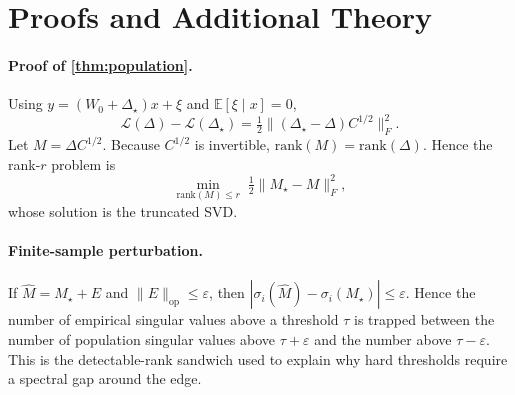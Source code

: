 \documentclass[10pt,twocolumn]{article}
\theoremstyle{definition}
\newcommand{\E}{\mathbb{E}}
\newcommand{\op}{\mathrm{op}}
\newcommand{\rank}{\mathrm{rank}}
\newcommand{\half}{\tfrac12}
\newcommand{\DeltaStar}{\Delta_\star}
\newcommand{\Mstar}{M_\star}
\newcommand{\Mhat}{\widehat M}
\begin{document}
\appendix

\section{Proofs and Additional Theory}
\label{app:proofs}

\paragraph{Proof of \cref{thm:population}.}
Using $y=(W_0+\DeltaStar)x+\xi$ and $\E[\xi\mid x]=0$,
\begin{equation}
    \mathcal L(\Delta)-\mathcal L(\DeltaStar)=\half\| (\DeltaStar-\Delta)C^{1/2}\|_F^2.
\end{equation}
Let $M=\Delta C^{1/2}$.  Because $C^{1/2}$ is invertible, $\rank(M)=\rank(\Delta)$.  Hence the rank-$r$ problem is
\begin{equation}
    \min_{\rank(M)\le r} \; \half\|\Mstar-M\|_F^2,
\end{equation}
whose solution is the truncated SVD.

\paragraph{Finite-sample perturbation.}
If $\Mhat=\Mstar+E$ and $\|E\|_{\op}\le\varepsilon$, then
$|\sigma_i(\Mhat)-\sigma_i(\Mstar)|\le\varepsilon$.  Hence the number
of empirical singular values above a threshold $\tau$ is trapped between the
number of population singular values above $\tau+\varepsilon$ and the number
above $\tau-\varepsilon$.  This is the detectable-rank sandwich used to
explain why hard thresholds require a spectral gap around the edge.
\end{document}
